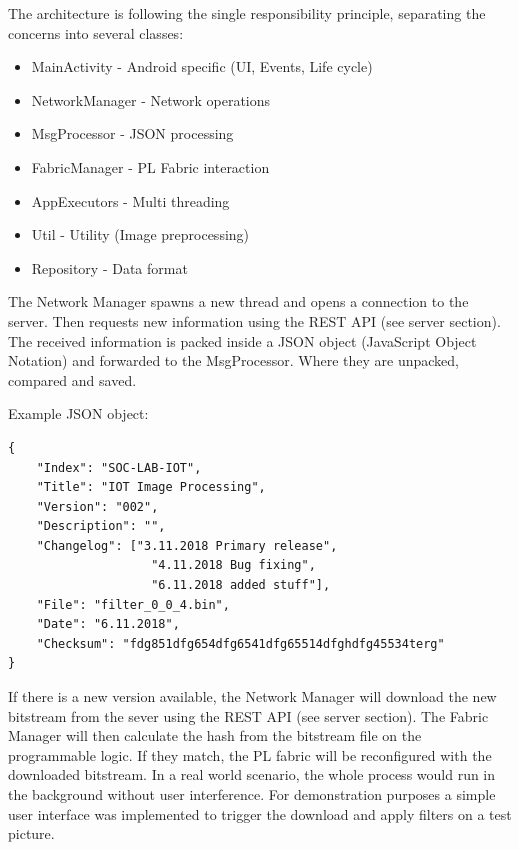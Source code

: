 The architecture is following the single responsibility principle, separating the concerns into several classes:

\begin{itemize}
    \item MainActivity 	    - Android specific (UI, Events, Life cycle)
    \item NetworkManager	- Network operations 
    \item MsgProcessor	    - JSON processing 
    \item FabricManager	    - PL Fabric interaction
    \item AppExecutors	    - Multi threading
    \item Util			    - Utility (Image preprocessing)
    \item Repository        - Data format
\end{itemize}


The Network Manager spawns a new thread and opens a connection to the server. Then requests new information using the REST API (see server section). The received information is packed inside a JSON object (JavaScript Object Notation) and forwarded to the MsgProcessor. Where they are unpacked, compared and saved.

Example JSON object:
\begin{verbatim}
{
    "Index": "SOC-LAB-IOT",
    "Title": "IOT Image Processing",
    "Version": "002",
    "Description": "",
    "Changelog": ["3.11.2018 Primary release", 
                    "4.11.2018 Bug fixing", 
                    "6.11.2018 added stuff"],
    "File": "filter_0_0_4.bin",
    "Date": "6.11.2018",
    "Checksum": "fdg851dfg654dfg6541dfg65514dfghdfg45534terg"
}  
\end{verbatim}



If there is a new version available, the Network Manager will download the new bitstream from the sever using the REST API (see server section). The Fabric Manager will then calculate the hash from the bitstream file on the programmable logic. If they match, the PL fabric will be reconfigured with the downloaded bitstream. In a real world scenario, the whole process would run in the background without user interference. For demonstration purposes a simple user interface was implemented to trigger the download and apply filters on a test picture.

